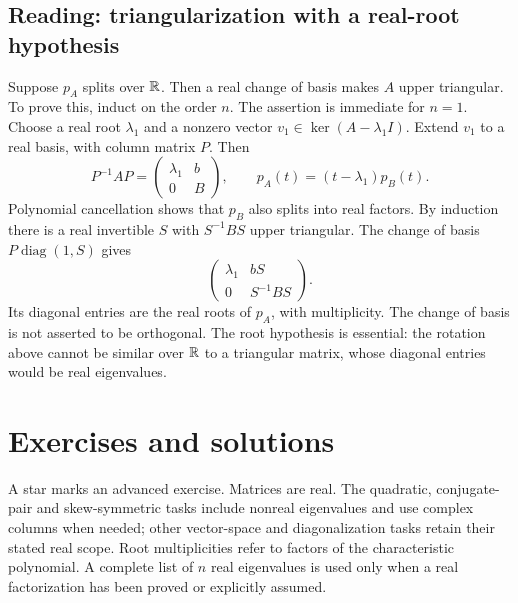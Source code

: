 \subsection*{Reading: triangularization with a real-root hypothesis}
Suppose \(p_A\) splits over \(\mathbb R\). Then a real change of basis makes
\(A\) upper triangular. To prove this, induct on the order \(n\).
The assertion is immediate for \(n=1\). Choose a real root \(\lambda_1\)
and a nonzero vector \(v_1\in\ker(A-\lambda_1I)\).
Extend \(v_1\) to a real basis, with column matrix \(P\). Then
\[
 P^{-1}AP=\begin{pmatrix}\lambda_1&b\\0&B\end{pmatrix},
 \qquad p_A(t)=(t-\lambda_1)p_B(t).
\]
Polynomial cancellation shows that \(p_B\) also splits into real factors.
By induction there is a real invertible \(S\) with \(S^{-1}BS\)
upper triangular. The change of basis \(P\operatorname{diag}(1,S)\)
gives
\[
 \begin{pmatrix}\lambda_1&bS\\0&S^{-1}BS\end{pmatrix}.
\]
Its diagonal entries are the real roots of \(p_A\), with multiplicity.
The change of basis is not asserted to be orthogonal.
The root hypothesis is essential: the rotation above cannot be similar
over \(\mathbb R\) to a triangular matrix, whose diagonal entries would be
real eigenvalues.

\clearpage
\section*{Exercises and solutions}
A star marks an advanced exercise. Matrices are real. The quadratic,
conjugate-pair and skew-symmetric tasks include nonreal eigenvalues and
use complex columns when needed; other vector-space and diagonalization
tasks retain their stated real scope. Root multiplicities refer to factors
of the characteristic polynomial. A complete list of \(n\) real eigenvalues
is used only when a real factorization has been proved or explicitly assumed.

